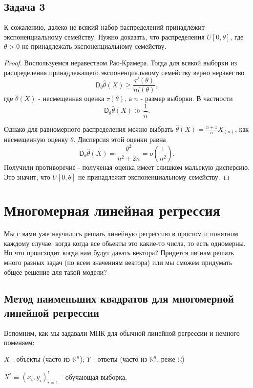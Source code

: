 \subsection*{Задача 3}

К сожалению, далеко не всякий набор распределений принадлежит экспоненциальному семейству. Нужно доказать, что распределения
$U[0, \theta]$, где $\theta > 0$ не принадлежать экспоненциальному семейству.

\begin{proof}
  Воспользуемся неравеством Рао-Крамера. Тогда для всякой выборки из распределения принадлежащего экспоненциальному семейству верно неравество
  $$
    \mathsf{D}_\theta \widehat\theta(X) \geq \frac{\tau'(\theta)}{ni(\theta)},
  $$
  где $\widehat\theta(X)$ - несмещенная оценка $\tau(\theta)$, а $n$ - размер выборки.
  В частности
  $$\mathsf{D}_\theta \widehat\theta(X) \gg \frac{1}{n}.$$
  
  Однако для равномерного распределения можно выбрать $\widehat\theta(X) = \frac{n+1}{n} X_{(n)}$, как несмещенную оценку $\theta$. Дисперсия этой оценки равна
  $$
    \mathsf{D}_\theta \widehat\theta(X) = \frac{\theta^2}{n^2 + 2n} = o\left(\frac{1}{n^2}\right).
  $$
  Получили противоречие - полученая оценка имеет слишком мальекую дисперсию. Это значит, что $U[0, \theta]$ не принадлежит экспоненциальному семейству.
\end{proof}

\section*{Многомерная линейная регрессия}
Мы с вами уже научились решать линейную регрессию в простом и понятном каждому случае: когда когда все обьекты это какие-то числа, то есть одномерны. Но что происходит когда нам будут давать вектора? Придется ли нам решать много разных задач (по всем значениям вектора) или мы сможем придумать общее решение для такой модели?


\subsection*{Метод наименьших квадратов для многомерной линейной регрессии}
Вспомним, как мы задавали МНК для обычной линейной регрессии и немного поменяем:

$X$ - объекты (часто из $\mathbb{R}^n$); $Y$ - ответы (часто из $\mathbb{R}^n$, реже $\mathbb{R}$)

$X^{l}$ = $(x_i, y_i)^l_{i = 1}$ - обучающая выборка.

